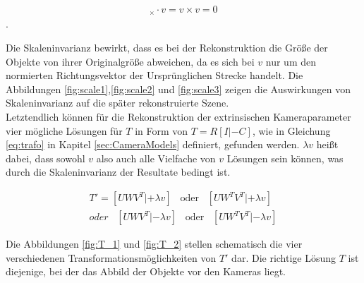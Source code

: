 
\begin{gather}
[C'_\delta]_\times \cdot v = v \times v = 0
\end{gather} 
.

Die Skaleninvarianz bewirkt, dass es bei der Rekonstruktion die Größe der Objekte von ihrer Originalgröße abweichen, da es sich bei $v$ nur um den normierten Richtungsvektor der Ursprünglichen Strecke handelt. Die Abbildungen \ref{fig:scale1},\ref{fig:scale2} und \ref{fig:scale3} zeigen die Auswirkungen von Skaleninvarianz auf die später rekonstruierte Szene. \\

Letztendlich können für die Rekonstruktion der extrinsischen Kameraparameter vier mögliche Lösungen für $T$ in Form von $T = R[I|-C]$, wie in Gleichung \ref{eq:trafo} in Kapitel \ref{sec:CameraModels} definiert, gefunden werden\cite{HZ,Ferid,phdextrinsicPara}. $\lambda v$ heißt dabei, dass sowohl $v$ also auch alle Vielfache von $v$ Lösungen sein können, was durch die Skaleninvarianz der Resultate bedingt ist\cite{HZ,Ferid,phdextrinsicPara}. 

\begin{gather}
T' = [UWV^T|+\lambda v] \;\;\; \text{oder} \;\;\;[UW^TV^T|+\lambda v]\\
\textit{oder}\;\;\; [UWV^T|-\lambda v] \;\;\; \text{oder} \;\;\;[UW^TV^T|-\lambda v]
\end{gather}

Die Abbildungen \ref{fig:T_1} und \ref{fig:T_2} stellen schematisch die vier verschiedenen Transformationsmöglichkeiten von $T'$ dar. Die richtige Lösung $T$ ist diejenige, bei der das Abbild der Objekte vor den Kameras liegt.\\\\


